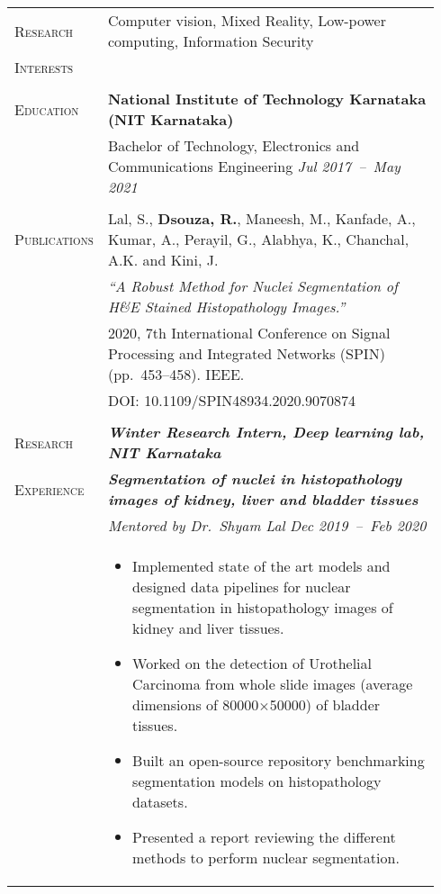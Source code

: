 \documentclass[letterpaper, 10pt, oneside]{article}
\newcommand{\stitle}[1]{\normalsize{\textsc{#1}}}
\newcommand{\bdit}[1]{\textit{\textbf{#1}}}
\begin{document}
\noindent \begin{longtable}{@{} p{0.14\linewidth} p{0.8\linewidth}}

\stitle{Research}  & Computer vision, Mixed Reality, Low-power computing, Information Security \\
\stitle{Interests} & \\
\\


\stitle{Education} & \textbf{National Institute of Technology Karnataka (NIT Karnataka)} \\
                   & Bachelor of Technology, Electronics and Communications Engineering \hfill \hspace{-3em} \textit{Jul 2017\ --\ May 2021} \\
\\


\stitle{Publications} & Lal, S., \textbf{Dsouza, R.}, Maneesh, M., Kanfade, A., Kumar, A., Perayil, G., Alabhya, K., Chanchal, A.K. and Kini, J. \\
                      & \textit{``A Robust Method for Nuclei Segmentation of H\&E Stained Histopathology Images.''} \\
                      & 2020, 7th International Conference on Signal Processing and Integrated Networks (SPIN) (pp.~453--458)\@. IEEE\@.  \\
                      & \textcolor{dark-purple}{DOI\@: 10.1109/SPIN48934.2020.9070874} \\
\\


\stitle{Research}   & \bdit{Winter Research Intern, Deep learning lab, NIT Karnataka} \\
\stitle{Experience} & \bdit{Segmentation of nuclei in histopathology images of kidney, liver and bladder tissues} \\
                    & \textit{Mentored by Dr.\ Shyam Lal} \hfill \hspace{-3em} \textit{Dec 2019\ --\ Feb 2020} \\
                    & \parbox{0.8\textwidth}{%
                        \begin{itemize}[leftmargin=*, itemsep=-0.88ex, topsep=-0.88ex]
                            \item Implemented state of the art models and designed data pipelines for nuclear segmentation in histopathology images of kidney and liver tissues. 
                            \item Worked on the detection of Urothelial Carcinoma from whole slide images (average dimensions of 80000$\times$50000) of bladder tissues.
                            \item Built an open-source repository benchmarking segmentation models on histopathology datasets.
                            \item Presented a report reviewing the different methods to perform nuclear segmentation.
                        \end{itemize}
                    }
\\
\\


\end{longtable}
\end{document}
